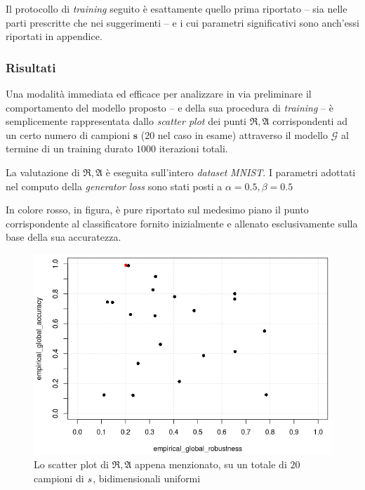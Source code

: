 \documentclass[a4paper, twoside]{article}
\begin{document}
Il protocollo di \textit{training} seguito è esattamente quello prima riportato -- sia nelle parti prescritte che nei suggerimenti -- e i cui parametri significativi sono anch'essi riportati in appendice.

\subsubsection{Risultati}

Una modalità immediata ed efficace per analizzare in via preliminare il comportamento del modello proposto -- e della sua procedura di \textit{training} -- è semplicemente rappresentata dallo \textit{scatter plot} dei punti $\mathfrak{R}, \mathfrak{A}$ corrispondenti ad un certo numero di campioni $\boldsymbol{s}$ ($20$ nel caso in esame) attraverso il modello $\mathcal{G}$ al termine di un training durato $1000$ iterazioni totali.

La valutazione di $\mathfrak{R}, \mathfrak{A}$ è eseguita sull'intero \textit{dataset} \textit{MNIST}. I parametri adottati nel computo della \textit{generator loss} sono stati posti a $\alpha=0.5, \beta=0.5$

In colore rosso, in figura, è pure riportato sul medesimo piano il punto corrispondente al classificatore fornito inizialmente e allenato esclusivamente sulla base della sua accuratezza.

\begin{figure}[H]
	\centering
	\includegraphics[scale=0.68]{my-graph-scatterplot.png}
	\captionsetup{labelformat=empty}
	\caption{Lo scatter plot di $\mathfrak{R}, \mathfrak{A}$ appena menzionato, su un totale di $20$ campioni di $\boldmath{s}$, bidimensionali uniformi}
\end{figure}
\end{document}
